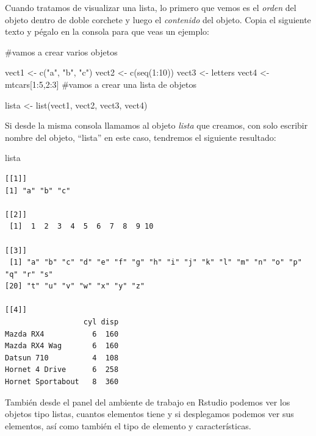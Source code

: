 \documentclass[
  letterpaper,
  DIV=11,
  numbers=noendperiod]{scrreprt}
\newenvironment{Shaded}{\begin{snugshade}}{\end{snugshade}}
\newcommand{\CommentTok}[1]{\textcolor[rgb]{0.37,0.37,0.37}{#1}}
\newcommand{\DecValTok}[1]{\textcolor[rgb]{0.68,0.00,0.00}{#1}}
\newcommand{\FunctionTok}[1]{\textcolor[rgb]{0.28,0.35,0.67}{#1}}
\newcommand{\NormalTok}[1]{\textcolor[rgb]{0.00,0.23,0.31}{#1}}
\newcommand{\OtherTok}[1]{\textcolor[rgb]{0.00,0.23,0.31}{#1}}
\newcommand{\SpecialCharTok}[1]{\textcolor[rgb]{0.37,0.37,0.37}{#1}}
\newcommand{\StringTok}[1]{\textcolor[rgb]{0.13,0.47,0.30}{#1}}
\begin{document}
Cuando tratamos de visualizar una lista, lo primero que vemos es el
\emph{orden} del objeto dentro de doble corchete y luego el
\emph{contenido} del objeto. Copia el siguiente texto y pégalo en la
consola para que veas un ejemplo:

\begin{Shaded}
\begin{Highlighting}[]
\CommentTok{\#vamos a crear varios objetos }

\NormalTok{vect1 }\OtherTok{\textless{}{-}} \FunctionTok{c}\NormalTok{(}\StringTok{"a"}\NormalTok{, }\StringTok{"b"}\NormalTok{, }\StringTok{"c"}\NormalTok{)}
\NormalTok{vect2 }\OtherTok{\textless{}{-}} \FunctionTok{c}\NormalTok{(}\FunctionTok{seq}\NormalTok{(}\DecValTok{1}\SpecialCharTok{:}\DecValTok{10}\NormalTok{))}
\NormalTok{vect3 }\OtherTok{\textless{}{-}}\NormalTok{ letters}
\NormalTok{vect4 }\OtherTok{\textless{}{-}}\NormalTok{ mtcars[}\DecValTok{1}\SpecialCharTok{:}\DecValTok{5}\NormalTok{,}\DecValTok{2}\SpecialCharTok{:}\DecValTok{3}\NormalTok{]}
\CommentTok{\#vamos a crear una lista de objetos}

\NormalTok{lista }\OtherTok{\textless{}{-}} \FunctionTok{list}\NormalTok{(vect1, vect2, vect3, vect4)}
\end{Highlighting}
\end{Shaded}

Si desde la misma consola llamamos al objeto \emph{lista} que creamos,
con solo escribir nombre del objeto, ``lista'' en este caso, tendremos
el siguiente resultado:

\begin{Shaded}
\begin{Highlighting}[]
\NormalTok{lista}
\end{Highlighting}
\end{Shaded}

\begin{verbatim}
[[1]]
[1] "a" "b" "c"

[[2]]
 [1]  1  2  3  4  5  6  7  8  9 10

[[3]]
 [1] "a" "b" "c" "d" "e" "f" "g" "h" "i" "j" "k" "l" "m" "n" "o" "p" "q" "r" "s"
[20] "t" "u" "v" "w" "x" "y" "z"

[[4]]
                  cyl disp
Mazda RX4           6  160
Mazda RX4 Wag       6  160
Datsun 710          4  108
Hornet 4 Drive      6  258
Hornet Sportabout   8  360
\end{verbatim}

También desde el panel del ambiente de trabajo en Rstudio podemos ver
los objetos tipo listas, cuantos elementos tiene y si desplegamos
podemos ver sus elementos, así como también el tipo de elemento y
características.
\end{document}
